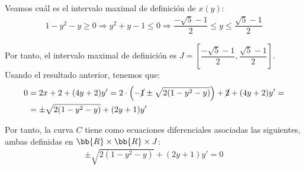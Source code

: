 \begin{ejercicio}
\begin{enumerate}
        Veamos cuál es el intervalo maximal de definición de $x(y)$:
        \begin{multline*}
            1-y^2-y\geq 0 \Longrightarrow y^2+y-1\leq 0 \Longrightarrow
            \dfrac{-\sqrt{5}-1}{2}\leq y \leq \dfrac{\sqrt{5}-1}{2}
        \end{multline*}

        Por tanto, el intervalo maximal de definición es $J=\left[\dfrac{-\sqrt{5}-1}{2}, \dfrac{\sqrt{5}-1}{2}\right]$.
        Usando el resultado anterior, tenemos que:
        \begin{align*}
            0&=2x+2+(4y+2)y' =2\cdot \left(-\cancel{1} \pm \sqrt{2(1-y^2-y)}\right) + \cancel{2} + (4y+2)y'
            =\\&= \pm \sqrt{2(1-y^2-y)} + (2y+1)y'
        \end{align*}

        Por tanto, la curva $C$ tiene como ecuaciones diferenciales asociadas las siguientes, ambas definidas en $\bb{R}\times \bb{R}\times J$:
        \begin{align*}
            \pm \sqrt{2(1-y^2-y)} + (2y+1)y'=0
        \end{align*}

    \end{enumerate}
\end{ejercicio}


